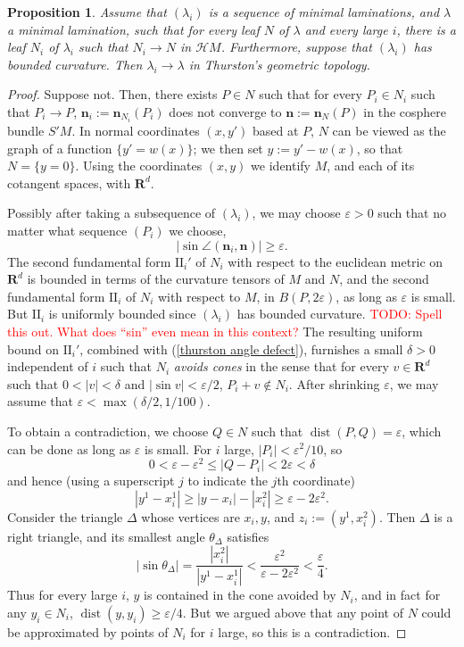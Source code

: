 \documentclass[reqno,11pt]{amsart}
\newcommand{\RR}{\mathbf{R}}
\DeclareMathOperator{\dist}{dist}
\newcommand{\Hypspace}{\mathscr H}
\newcommand{\Two}{\mathrm{I\!I}}
\newcommand{\normal}{\mathbf n}
\newcommand{\dfn}[1]{\emph{#1}\index{#1}}
\newtheorem{proposition}[theorem]{Proposition}
\theoremstyle{definition}
\numberwithin{equation}{section}
\newcommand\todo[1]{\textcolor{red}{TODO: #1}}
\begin{document}
\begin{proposition}\label{convergence of geodesic lams in thurston}
Assume that $(\lambda_i)$ is a sequence of minimal laminations, and $\lambda$ a minimal lamination, such that for every leaf $N$ of $\lambda$ and every large $i$, there is a leaf $N_i$ of $\lambda_i$ such that $N_i \to N$ in $\Hypspace M$.
Furthermore, suppose that $(\lambda_i)$ has bounded curvature.
Then $\lambda_i \to \lambda$ in Thurston's geometric topology.
\end{proposition}
\begin{proof}
Suppose not. Then, there exists $P \in N$ such that for every $P_i \in N_i$ such that $P_i \to P$, $\normal_i := \normal_{N_i}(P_i)$ does not converge to $\normal := \normal_N(P)$ in the cosphere bundle $S'M$.
In normal coordinates $(x, y')$ based at $P$, $N$ can be viewed as the graph of a function $\{y' = w(x)\}$; we then set $y := y' - w(x)$, so that $N = \{y = 0\}$.
Using the coordinates $(x, y)$ we identify $M$, and each of its cotangent spaces, with $\RR^d$.

Possibly after taking a subsequence of $(\lambda_i)$, we may choose $\varepsilon > 0$ such that no matter what sequence $(P_i)$ we choose,
\begin{equation}\label{thurston angle defect}
	|\sin \angle(\normal_i, \normal)| \geq \varepsilon.
\end{equation}
The second fundamental form $\Two_i'$ of $N_i$ with respect to the euclidean metric on $\RR^d$ is bounded in terms of the curvature tensors of $M$ and $N$, and the second fundamental form $\Two_i$ of $N_i$ with respect to $M$, in $B(P, 2\varepsilon)$, as long as $\varepsilon$ is small.
But $\Two_i$ is uniformly bounded since $(\lambda_i)$ has bounded curvature. \todo{Spell this out. What does ``sin'' even mean in this context?}
The resulting uniform bound on $\Two_i'$, combined with (\ref{thurston angle defect}), furnishes a small $\delta > 0$ independent of $i$ such that $N_i$ \dfn{avoids cones} in the sense that for every $v \in \RR^d$ such that $0 < |v| < \delta$ and $|\sin v| < \varepsilon/2$, $P_i + v \notin N_i$.
After shrinking $\varepsilon$, we may assume that $\varepsilon < \max(\delta/2, 1/100)$.

To obtain a contradiction, we choose $Q \in N$ such that $\dist(P, Q) = \varepsilon$, which can be done as long as $\varepsilon$ is small.
For $i$ large, $|P_i| < \varepsilon^2/10$, so
$$0 < \varepsilon - \varepsilon^2 \leq |Q - P_i| < 2\varepsilon < \delta$$
and hence (using a superscript $j$ to indicate the $j$th coordinate)
$$|y^1 - x_i^1| \geq |y - x_i| - |x_i^2| \geq \varepsilon - 2\varepsilon^2.$$
Consider the triangle $\Delta$ whose vertices are $x_i, y$, and $z_i := (y^1, x_i^2)$.
Then $\Delta$ is a right triangle, and its smallest angle $\theta_\Delta$ satisfies
$$|\sin \theta_\Delta| = \frac{|x_i^2|}{|y^1 - x_i^1|} < \frac{\varepsilon^2}{\varepsilon - 2\varepsilon^2} < \frac{\varepsilon}{4}.$$
Thus for every large $i$, $y$ is contained in the cone avoided by $N_i$, and in fact for any $y_i \in N_i$, $\dist(y, y_i) \geq \varepsilon/4$.
But we argued above that any point of $N$ could be approximated by points of $N_i$ for $i$ large, so this is a contradiction.
\end{proof}
\end{document}
